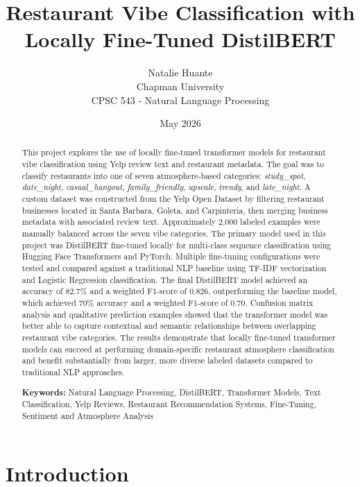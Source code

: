 \documentclass[11pt]{article}
\title{Restaurant Vibe Classification with Locally Fine-Tuned DistilBERT}
\author{
Natalie Huante \\
Chapman University \\
CPSC 543 - Natural Language Processing
}
\date{May 2026}
\begin{document}
\maketitle


\begin{abstract}

This project explores the use of locally fine-tuned transformer models for restaurant vibe classification 
using Yelp review text and restaurant metadata. The goal was to classify restaurants into one of seven 
atmosphere-based categories: \textit{study\_spot}, \textit{date\_night}, \textit{casual\_hangout}, 
\textit{family\_friendly}, \textit{upscale}, \textit{trendy}, and \textit{late\_night}. 
A custom dataset was constructed from the Yelp Open Dataset by filtering restaurant businesses located in 
Santa Barbara, Goleta, and Carpinteria, then merging business metadata with associated review text. 
Approximately 2,000 labeled examples were manually balanced across the seven vibe categories. 
The primary model used in this project was DistilBERT fine-tuned locally for multi-class sequence classification 
using Hugging Face Transformers and PyTorch. Multiple fine-tuning configurations were tested and compared against 
a traditional NLP baseline using TF-IDF vectorization and Logistic Regression classification. 
The final DistilBERT model achieved an accuracy of 82.7\% and a weighted F1-score of 0.826, outperforming the 
baseline model, which achieved 70\% accuracy and a weighted F1-score of 0.70. Confusion matrix analysis and 
qualitative prediction examples showed that the transformer model was better able to capture contextual and 
semantic relationships between overlapping restaurant vibe categories. The results demonstrate that locally 
fine-tuned transformer models can succeed at performing domain-specific restaurant atmosphere classification 
and benefit substantially from larger, more diverse labeled datasets compared to traditional NLP approaches.


\medbreak\noindent\textbf{Keywords:} Natural Language Processing, DistilBERT, Transformer Models, Text Classification, Yelp Reviews, Restaurant Recommendation Systems, Fine-Tuning, Sentiment and Atmosphere Analysis

\end{abstract}



\section{Introduction}
\end{document}
